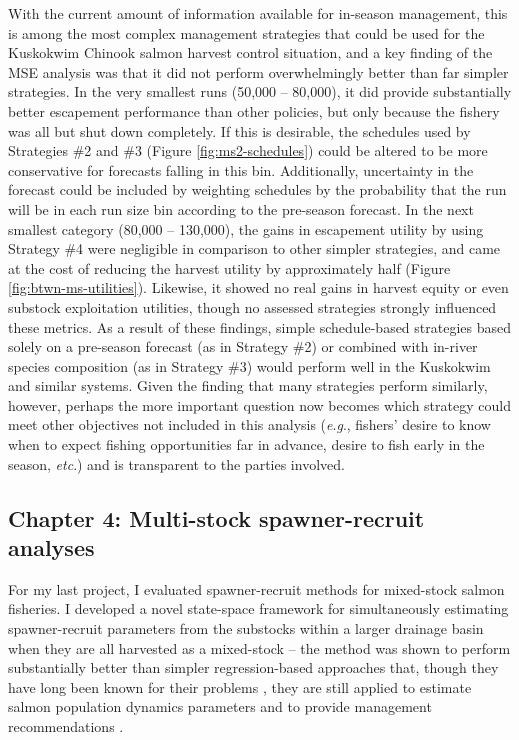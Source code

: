 \documentclass[12pt,]{book}
\theoremstyle{definition}
\theoremstyle{definition}
\theoremstyle{definition}
\theoremstyle{remark}
\begin{document}
With the current amount of information available for in-season
management, this is among the most complex management strategies that
could be used for the Kuskokwim Chinook salmon harvest control
situation, and a key finding of the MSE analysis was that it did not
perform overwhelmingly better than far simpler strategies. In the very
smallest runs (50,000 -- 80,000), it did provide substantially better
escapement performance than other policies, but only because the fishery
was all but shut down completely. If this is desirable, the schedules
used by Strategies \#2 and \#3 (Figure \ref{fig:ms2-schedules}) could be
altered to be more conservative for forecasts falling in this bin.
Additionally, uncertainty in the forecast could be included by weighting
schedules by the probability that the run will be in each run size bin
according to the pre-season forecast. In the next smallest category
(80,000 -- 130,000), the gains in escapement utility by using Strategy
\#4 were negligible in comparison to other simpler strategies, and came
at the cost of reducing the harvest utility by approximately half
(Figure \ref{fig:btwn-ms-utilities}). Likewise, it showed no real gains
in harvest equity or even substock exploitation utilities, though no
assessed strategies strongly influenced these metrics. As a result of
these findings, simple schedule-based strategies based solely on a
pre-season forecast (as in Strategy \#2) or combined with in-river
species composition (as in Strategy \#3) would perform well in the
Kuskokwim and similar systems. Given the finding that many strategies
perform similarly, however, perhaps the more important question now
becomes which strategy could meet other objectives not included in this
analysis (\emph{e}.\emph{g}., fishers' desire to know when to expect
fishing opportunities far in advance, desire to fish early in the
season, \emph{etc}.) and is transparent to the parties involved.

\subsection{Chapter 4: Multi-stock spawner-recruit
analyses}\label{chapter-4-multi-stock-spawner-recruit-analyses}

\noindent
For my last project, I evaluated spawner-recruit methods for mixed-stock
salmon fisheries. I developed a novel state-space framework for
simultaneously estimating spawner-recruit parameters from the substocks
within a larger drainage basin when they are all harvested as a
mixed-stock -- the method was shown to perform substantially better than
simpler regression-based approaches that, though they have long been
known for their problems
\citep{ludwig-walters-1981, walters-1985, walters-martell-2004}, they
are still applied to estimate salmon population dynamics parameters and
to provide management recommendations
\citep{clark-etal-2009, korman-english-2013}.
\end{document}
